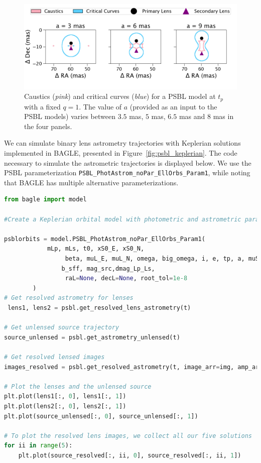 \documentclass[twocolumn]{aastex701}
\newcommand{\tcomnot}{t_{com,0,\sun}}
\newcommand{\w}{\omega_{pri}}
\newcommand{\bigomega}{\Omega_{sec}}
\newcommand{\inclination}{\textit{i}}
\newcommand{\period}{\textit{P}}
\begin{document}
\begin{figure}
    \centering
    \includegraphics[width= \textwidth]{figures/magmaps_varysep.png}
    \caption{Caustics (\emph{pink}) and critical curves (\emph{blue}) for a PSBL model at $t_p$ with a fixed $q=1$. The value of $a$ (provided as an input to the PSBL models) varies between $3.5$ mas, $5$ mas, $6.5$ mas and $8$ mas in the four panels.}
    \label{fig:magmaps_varysep}
\end{figure}

We can simulate binary lens astrometry trajectories with Keplerian solutions implemented in BAGLE, presented in Figure~\ref{fig:psbl_keplerian}. The code necessary to simulate the astrometric trajectories is displayed below. We use the PSBL parameterization \texttt{PSBL\_PhotAstrom\_noPar\_EllOrbs\_Param1}, while noting that BAGLE has multiple alternative parameterizations. 





\begin{lstlisting}[language=Python]
from bagle import model

#Create a Keplerian orbital model with photometric and astrometric parameters

psblorbits = model.PSBL_PhotAstrom_noPar_EllOrbs_Param1(
            mLp, mLs, t0, xS0_E, xS0_N,
                 beta, muL_E, muL_N, omega, big_omega, i, e, tp, a, muS_E, muS_N, dL, dS,
                b_sff, mag_src,dmag_Lp_Ls,
                 raL=None, decL=None, root_tol=1e-8
        )
# Get resolved astrometry for lenses
 lens1, lens2 = psbl.get_resolved_lens_astrometry(t)

# Get unlensed source trajectory 
source_unlensed = psbl.get_astrometry_unlensed(t)

# Get resolved lensed images 
images_resolved = psbl.get_resolved_astrometry(t, image_arr=img, amp_arr=amp)

# Plot the lenses and the unlensed source
plt.plot(lens1[:, 0], lens1[:, 1]) 
plt.plot(lens2[:, 0], lens2[:, 1])
plt.plot(source_unlensed[:, 0], source_unlensed[:, 1])

# To plot the resolved lens images, we collect all our five solutions
for ii in range(5):
    plt.plot(source_resolved[:, ii, 0], source_resolved[:, ii, 1])

\end{lstlisting}
\end{document}
